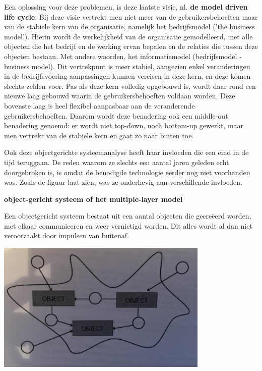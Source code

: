 Een oplossing voor deze problemen, is deze laatste visie, nl. \textbf{de model driven life cycle}. Bij deze visie vertrekt men niet meer van de gebruikersbehoeften maar van de stabiele kern van de organisatie, namelijk het bedrijfsmodel ('the business model'). Hierin wordt de werkelijkheid van de organisatie gemodelleerd, met alle objecten die het bedrijf en de werking ervan bepalen en de relaties die tussen deze objecten bestaan. Met andere woorden, het informatiemodel (bedrijfsmodel - business model). Dit vertrekpunt is meer stabiel, aangezien enkel veranderingen in de bedrijfsvoering aanpassingen kunnen vereisen in deze kern, en deze komen slechts zelden voor. Pas als deze kern volledig opgebouwd is, wordt daar rond een nieuwe laag gebouwd waarin de gebruikersbehoeften voldaan worden. Deze bovenste laag is heel flexibel aanpasbaar aan de veranderende gebruikersbehoeften. Daarom wordt deze benadering ook een middle-out benadering genoemd: er wordt niet top-down, noch bottom-up gewerkt, maar men vertrekt van de stabiele kern en gaat zo naar buiten toe.

Ook deze objectgerichte systeemanalyse heeft haar invloeden die een eind in de tijd teruggaan. De reden waarom ze slechts een aantal jaren geleden echt doorgebroken is, is omdat de benodigde technologie eerder nog niet voorhanden was. Zoals de figuur laat zien, was ze onderhevig aan verschillende invloeden.

\textbf{object-gericht systeem of het multiple-layer model}

Een objectgericht systeem bestaat uit een aantal objecten die gecreëerd worden, met elkaar communiceren en weer vernietigd worden. Dit alles wordt al dan niet veroorzaakt door impulsen van buitenaf.


\begin{center}
\includegraphics[width=4in]{img/IMG_3583}%
\end{center}

